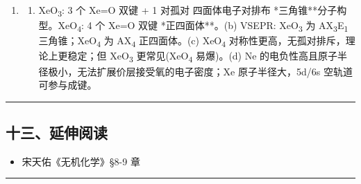 \begin{enumerate}
\item
  \begin{enumerate}
  \def\labelenumii{(\alph{enumii})}
  \tightlist
  \item
    XeO\textsubscript{3}: 3 个 Xe=O 双键 + 1 对孤对 \箭 四面体电子对排布 \箭 **三角锥**分子构型。XeO\textsubscript{4}: 4 个 Xe=O 双键 \箭 **正四面体**。(b) VSEPR: XeO\textsubscript{3} 为 AX\textsubscript{3}E\textsubscript{1} \箭 三角锥；XeO\textsubscript{4} 为 AX\textsubscript{4} \箭 正四面体。(c) XeO\textsubscript{4} 对称性更高，无孤对排斥，理论上更稳定；但 XeO\textsubscript{3} 更常见(XeO\textsubscript{4} 易爆)。(d) Ne 的电负性高且原子半径极小，无法扩展价层接受氧的电子密度；Xe 原子半径大，5d/6s 空轨道可参与成键。
  \end{enumerate}
\end{enumerate}

\begin{center}\rule{0.5\linewidth}{0.5pt}\end{center}

\subsection{十三、延伸阅读}\label{ux5341ux4e09ux5ef6ux4f38ux9605ux8bfb}

\begin{itemize}
\tightlist
\item
  宋天佑《无机化学》§8-9 章
\end{itemize}

\begin{center}\rule{0.5\linewidth}{0.5pt}\end{center}
